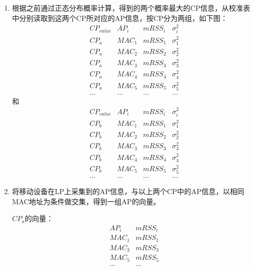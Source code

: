 \documentclass[UTF8, twocolumn ]{ctexart}
\begin{document}
\begin{enumerate}
\item 根据之前通过正态分布概率计算，得到的两个概率最大的CP信息，从校准表中分别读取到这两个CP所对应的AP信息，按CP分为两组，如下图：
  \begin{displaymath}
    \begin{array}{c|c|c|c}
      CP_{value} & AP_{i} & mRSS_{i} & \sigma^{2}_{i} \\ \hline
      CP_{a} & MAC_{1} & mRSS_{1} & \sigma^{2}_{1} \\
      CP_{a} & MAC_{2} & mRSS_{2} & \sigma^{2}_{2} \\
      CP_{a} & MAC_{3} & mRSS_{3} & \sigma^{2}_{3} \\
      CP_{a} & MAC_{4} & mRSS_{4} & \sigma^{2}_{4} \\
      CP_{a} & MAC_{5} & mRSS_{5} & \sigma^{2}_{5} \\
      ... & ... & ... & ...
    \end{array}
  \end{displaymath}
  和
  \begin{displaymath}
    \begin{array}{c|c|c|c}
      CP_{value} & AP_{i} & mRSS_{i} & \sigma^{2}_{i} \\ \hline
      CP_{b} & MAC_{1} & mRSS_{1} & \sigma^{2}_{1} \\
      CP_{b} & MAC_{2} & mRSS_{2} & \sigma^{2}_{2} \\
      CP_{b} & MAC_{3} & mRSS_{3} & \sigma^{2}_{3} \\
      CP_{b} & MAC_{4} & mRSS_{4} & \sigma^{2}_{4} \\
      CP_{b} & MAC_{5} & mRSS_{5} & \sigma^{2}_{5} \\
      ... & ... & ... & ...
    \end{array}
  \end{displaymath}
\item 将移动设备在LP上采集到的AP信息，与以上两个CP中的AP信息，以相同MAC地址为条件做交集，得到一组AP的向量。
  \par
  $CP_{a}$的向量：
  \begin{displaymath}
    \begin{array}{c|c}
      AP_{i} & mRSS_{i} \\ \hline
      MAC_{1} & mRSS_{1} \\
      MAC_{3} & mRSS_{3} \\
      MAC_{5} & mRSS_{5} \\
      ... & ...
    \end{array}

\end{displaymath}
\end{enumerate}
\end{document}
